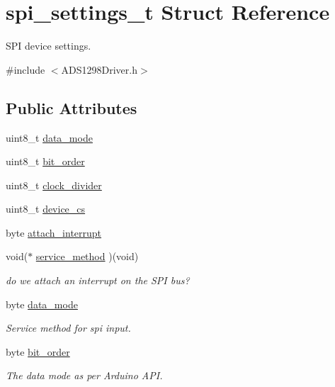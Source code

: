 \hypertarget{structspi__settings__t}{\section{spi\-\_\-settings\-\_\-t \-Struct \-Reference}
\label{structspi__settings__t}
}


\-S\-P\-I device settings.  




{\ttfamily \#include $<$\-A\-D\-S1298\-Driver.\-h$>$}

\subsection*{\-Public \-Attributes}
\begin{DoxyCompactItemize}
\item 
uint8\-\_\-t \hyperlink{structspi__settings__t_a4f65ec88d3910aee5cb7c8c7f31c8f95}{data\-\_\-mode}
\item 
uint8\-\_\-t \hyperlink{structspi__settings__t_a51403976cb27fc790da821f19c3805c1}{bit\-\_\-order}
\item 
uint8\-\_\-t \hyperlink{structspi__settings__t_a9875fd618b56150ea4737756d02ba092}{clock\-\_\-divider}
\item 
uint8\-\_\-t \hyperlink{structspi__settings__t_aa92a826fb3282468e4574cc37e07ae71}{device\-\_\-cs}
\item 
byte \hyperlink{structspi__settings__t_aae2ae572e8d94487413f68c2ed08295d}{attach\-\_\-interrupt}
\item 
void($\ast$ \hyperlink{structspi__settings__t_a5c39f66eac994020a016c08dae03e71a}{service\-\_\-method} )(void)
\begin{DoxyCompactList}\small\item\em do we attach an interrupt on the \-S\-P\-I bus? \end{DoxyCompactList}\item 
byte \hyperlink{structspi__settings__t_a4ef3b51bb59cd49b4ad291443d2e3404}{data\-\_\-mode}
\begin{DoxyCompactList}\small\item\em \-Service method for spi input. \end{DoxyCompactList}\item 
byte \hyperlink{structspi__settings__t_ab50d718a4ec202c4077ad3c5170f0864}{bit\-\_\-order}
\begin{DoxyCompactList}\small\item\em \-The data mode as per \-Arduino \-A\-P\-I. \end{DoxyCompactList}\item 

\end{DoxyCompactItemize}
